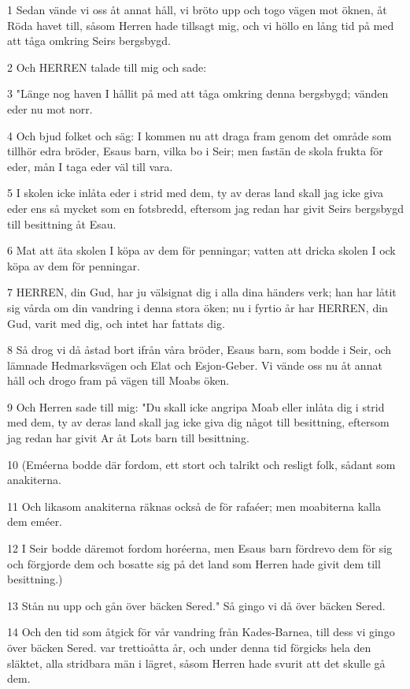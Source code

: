 \par 1 Sedan vände vi oss åt annat håll, vi bröto upp och togo vägen mot öknen, åt Röda havet till, såsom Herren hade tillsagt mig, och vi höllo en lång tid på med att tåga omkring Seirs bergsbygd.
\par 2 Och HERREN talade till mig och sade:
\par 3 "Länge nog haven I hållit på med att tåga omkring denna bergsbygd; vänden eder nu mot norr.
\par 4 Och bjud folket och säg: I kommen nu att draga fram genom det område som tillhör edra bröder, Esaus barn, vilka bo i Seir; men fastän de skola frukta för eder, mån I taga eder väl till vara.
\par 5 I skolen icke inlåta eder i strid med dem, ty av deras land skall jag icke giva eder ens så mycket som en fotsbredd, eftersom jag redan har givit Seirs bergsbygd till besittning åt Esau.
\par 6 Mat att äta skolen I köpa av dem för penningar; vatten att dricka skolen I ock köpa av dem för penningar.
\par 7 HERREN, din Gud, har ju välsignat dig i alla dina händers verk; han har låtit sig vårda om din vandring i denna stora öken; nu i fyrtio år har HERREN, din Gud, varit med dig, och intet har fattats dig.
\par 8 Så drog vi då åstad bort ifrån våra bröder, Esaus barn, som bodde i Seir, och lämnade Hedmarksvägen och Elat och Esjon-Geber. Vi vände oss nu åt annat håll och drogo fram på vägen till Moabs öken.
\par 9 Och Herren sade till mig: "Du skall icke angripa Moab eller inlåta dig i strid med dem, ty av deras land skall jag icke giva dig något till besittning, eftersom jag redan har givit Ar åt Lots barn till besittning.
\par 10 (Eméerna bodde där fordom, ett stort och talrikt och resligt folk, sådant som anakiterna.
\par 11 Och likasom anakiterna räknas också de för rafaéer; men moabiterna kalla dem eméer.
\par 12 I Seir bodde däremot fordom horéerna, men Esaus barn fördrevo dem för sig och förgjorde dem och bosatte sig på det land som Herren hade givit dem till besittning.)
\par 13 Stån nu upp och gån över bäcken Sered." Så gingo vi då över bäcken Sered.
\par 14 Och den tid som åtgick för vår vandring från Kades-Barnea, till dess vi gingo över bäcken Sered. var trettioåtta år, och under denna tid förgicks hela den släktet, alla stridbara män i lägret, såsom Herren hade svurit att det skulle gå dem.
